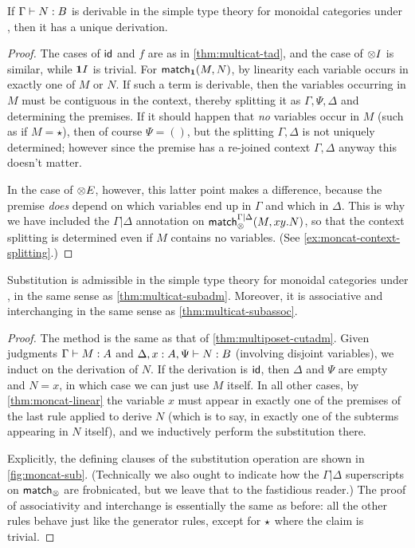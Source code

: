 \begin{lem}\label{thm:moncat-tad}
  If $\Gamma\vdash N:B$ is derivable in the simple type theory for monoidal categories under \cG, then it has a unique derivation.
\end{lem}
\begin{proof}
  The cases of $\mathsf{id}$ and $f$ are as in \cref{thm:multicat-tad}, and the case of $\mathord{\otimes}I$ is similar, while $\mathbf{1} I$ is trivial.
  For $\mathsf{match}_{\mathbf{1}}(M,N)$, by linearity each variable occurs in exactly one of $M$ or $N$.
  If such a term is derivable, then the variables occurring in $M$ must be contiguous in the context, thereby splitting it as $\Gamma,\Psi,\Delta$ and determining the premises.
  If it should happen that \emph{no} variables occur in $M$ (such as if $M=\star$), then of course $\Psi=()$, but the splitting $\Gamma,\Delta$ is not uniquely determined; however since the premise has a re-joined context $\Gamma,\Delta$ anyway this doesn't matter.

  In the case of $\mathord{\otimes}E$, however, this latter point makes a difference, because the premise \emph{does} depend on which variables end up in $\Gamma$ and which in $\Delta$.
  This is why we have included the $\Gamma|\Delta$ annotation on $\mathsf{match}_\otimes^{\Gamma|\Delta}(M,xy.N)$, so that the context splitting is determined even if $M$ contains no variables.
  (See \cref{ex:moncat-context-splitting}.)
\end{proof}

\begin{lem}\label{thm:moncat-subadm}
  Substitution is admissible in the simple type theory for monoidal categories under \cG, in the same sense as \cref{thm:multicat-subadm}.
  Moreover, it is associative and interchanging in the same sense as \cref{thm:multicat-subassoc}.
\end{lem}
\begin{proof}
  The method is the same as that of \cref{thm:multiposet-cutadm}.
  Given judgments $\Gamma\vdash M:A$ and $\Delta,x:A,\Psi \vdash N:B$ (involving disjoint variables), we induct on the derivation of $N$.
  If the derivation is $\mathsf{id}$, then $\Delta$ and $\Psi$ are empty and $N=x$, in which case we can just use $M$ itself.
  In all other cases, by \cref{thm:moncat-linear} the variable $x$ must appear in exactly one of the premises of the last rule applied to derive $N$ (which is to say, in exactly one of the subterms appearing in $N$ itself), and we inductively perform the substitution there.

  Explicitly, the defining clauses of the substitution operation are shown in \cref{fig:moncat-sub}.
  (Technically we also ought to indicate how the $\Gamma|\Delta$ superscripts on $\mathsf{match}_\otimes$ are frobnicated, but we leave that to the fastidious reader.)
  The proof of associativity and interchange is essentially the same as before: all the other rules behave just like the generator rules, except for $\mathord{\star}$ where the claim is trivial.
\end{proof}

